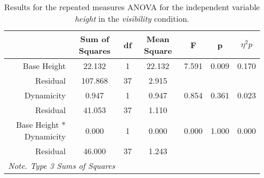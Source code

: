 \begin{table*}[ht]
    \centering
    \caption{Results for the repeated measures ANOVA for the independent variable \textit{height} in the \textit{visibility} condition.}
    \begin{tabular}{r|cccccc}
    \toprule
                                  & \textbf{Sum of Squares} & \textbf{df} & \textbf{Mean Square} & \textbf{F} & \textbf{p} & \textbf{$\eta^2p$} \\
    \midrule
    Base Height                   & 22.132                  & 1           & 22.132              & 7.591       & 0.009      & 0.170              \\
    Residual                      & 107.868                 & 37          & 2.915               &             &            &                    \\
    Dynamicity                    & 0.947                   & 1           & 0.947               & 0.854       & 0.361      & 0.023              \\
    Residual                      & 41.053                  & 37          & 1.110               &             &            &                    \\
    Base Height * Dynamicity      & 0.000                   & 1           & 0.000               & 0.000       & 1.000      & 0.000              \\
    Residual                      & 46.000                  & 37          & 1.243               &             &            &                    \\
    \bottomrule
    \multicolumn{7}{l}{\textit{Note. Type 3 Sums of Squares}}                                                                                                                                                                                                  
    \end{tabular}
\end{table*}


